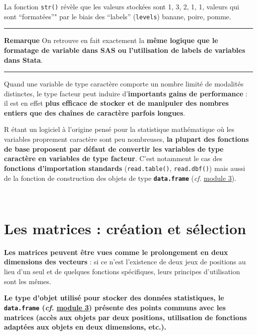 \documentclass[12pt,twosided, notitlepage]{book}
\begin{document}
La fonction \texttt{str()} révèle que les valeurs stockées sont 1, 3, 2,
1, 1, valeurs qui sont \enquote{formatées}" par le biais des
\enquote{labels} (\texttt{levels}) banane, poire,
pomme.

\begin{center}\rule{0.5\linewidth}{\linethickness}\end{center}

\textbf{Remarque} On retrouve en fait exactement la \textbf{même logique
que le formatage de variable dans SAS ou l'utilisation de labels de
variables dans Stata}.

\begin{center}\rule{0.5\linewidth}{\linethickness}\end{center}

Quand une variable de type caractère comporte un nombre limité de
modalités distinctes, le type facteur peut induire d'\textbf{importants
gains de performance} : il est en effet \textbf{plus efficace de stocker
et de manipuler des nombres entiers que des chaînes de caractère parfois
longues}.

R étant un logiciel à l'origine pensé pour la statistique mathématique
où les variables proprement caractère sont peu nombreuses, \textbf{la
plupart des fonctions de base proposent par défaut de convertir les
variables de type caractère en variables de type facteur}. C'est
notamment le cas des \textbf{fonctions d'importation standards}
(\texttt{read.table()},
\texttt{read.dbf()}) mais aussi de la fonction
de construction des objets de type \textbf{\texttt{data.frame}}
(\emph{cf.} \underline{module 3}).

~

\section{Les matrices : création et
sélection}\label{les-matrices-creation-et-selection}

\textbf{Les matrices peuvent être vues comme le prolongement en deux
dimensions des vecteurs} : si ce n'est l'existence de deux jeux de
positions au lieu d'un seul et de quelques fonctions spécifiques, leurs
principes d'utilisation sont les mêmes.

\textbf{Le type d'objet utilisé pour stocker des données statistiques,
le \texttt{data.frame} (\emph{cf.} \underline{module 3}) présente des
points communs avec les matrices (accès aux objets par deux positions,
utilisation de fonctions adaptées aux objets en deux dimensions, etc.).}
\end{document}
